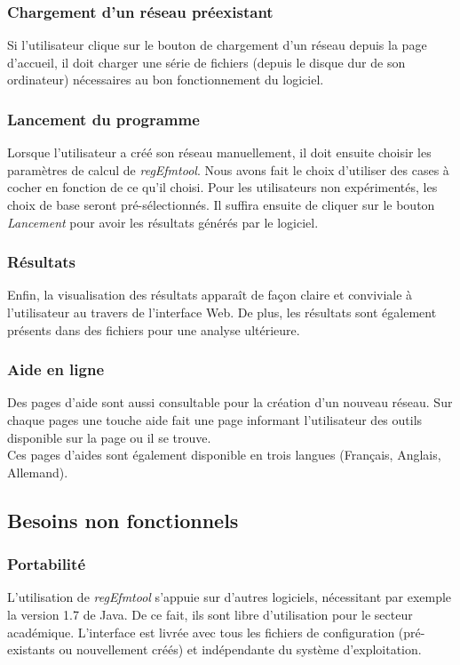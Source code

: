 \subsubsection{Chargement d'un réseau préexistant}
Si l'utilisateur clique sur le bouton de chargement d'un réseau depuis la page d'accueil, il doit charger une série de fichiers (depuis le disque dur de son ordinateur) nécessaires au bon fonctionnement du logiciel. 

\subsubsection{Lancement du programme}
Lorsque l'utilisateur a créé son réseau manuellement, il doit ensuite choisir les paramètres de calcul de \textit{regEfmtool}. Nous avons fait le choix d'utiliser des cases à cocher en fonction de ce qu'il choisi. Pour les utilisateurs non expérimentés, les choix de base seront pré-sélectionnés. Il suffira ensuite de cliquer sur le bouton \emph{Lancement} pour avoir les résultats générés par le logiciel.

\subsubsection{Résultats}
Enfin, la visualisation des résultats apparaît de façon claire et conviviale à l'utilisateur au travers de l'interface Web. De plus, les résultats sont également présents dans des fichiers pour une analyse ultérieure. %

\subsubsection{Aide en ligne}

Des pages d'aide sont aussi consultable pour la création d'un nouveau réseau.
Sur chaque pages une touche aide fait une page informant l'utilisateur des outils disponible sur la page ou il se trouve.
\\
Ces pages d'aides sont également disponible en trois langues (Français, Anglais, Allemand).

			
			
			
\subsection{Besoins non fonctionnels}

\subsubsection{Portabilité}
L'utilisation de \textit{regEfmtool} s'appuie sur d'autres logiciels, nécessitant par exemple la version 1.7 de Java. De ce fait, ils sont libre d'utilisation pour le secteur académique. L'interface est livrée avec tous les fichiers de configuration (pré-existants ou nouvellement créés) et indépendante du système d'exploitation. 

